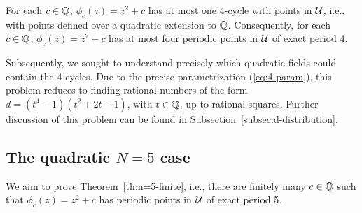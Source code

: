 \begin{theorem}
  For each $c \in \mathbb{Q}$, $\phi_c(z) = z^2 + c$ has at most one 4-cycle
  with points in $\mathcal{U}$, i.e., with points defined over a quadratic
  extension to $\mathbb{Q}$. Consequently, for each $c \in \mathbb{Q}$, $\phi_c(z) =
  z^2 + c$ has at most four periodic points in $\mathcal{U}$ of exact period 4.
\end{theorem}

Subsequently, we sought to understand precisely which quadratic fields
could contain the 4-cycles. Due to the precise parametrization
(\ref{eq:4-param}), this problem reduces to finding rational numbers
of the form $d = (t^4 - 1)(t^2 + 2t - 1)$, with $t \in \mathbb{Q}$, up to
rational squares. Further discussion of this problem can be found in
Subsection~\ref{subsec:d-distribution}.

\subsection{The quadratic $N = 5$ case}
\label{subsec:quadratic-5}

We aim to prove Theorem~\ref{th:n=5-finite}, i.e., there are finitely
many $c \in \mathbb{Q}$ such that $\phi_c(z) = z^2 + c$ has periodic points in
$\mathcal{U}$ of exact period 5.

